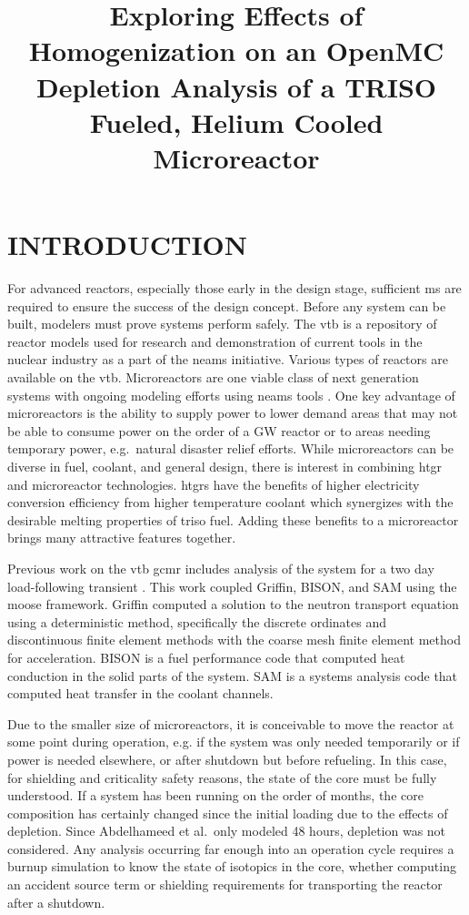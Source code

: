 \documentclass[letterpaper]{physor2024}
\title{Exploring Effects of Homogenization on an OpenMC Depletion Analysis of a TRISO Fueled, Helium Cooled Microreactor}
\begin{document}
\section{INTRODUCTION}\label{sec:intro}
For advanced reactors, especially those early in the design stage, sufficient \gls{ms} are required to ensure the success of the design concept. Before any system can be built, modelers must prove systems perform safely. The \gls{vtb} \cite{vtb2023} is a repository of reactor models used for research and demonstration of current tools in the nuclear industry as a part of the \gls{neams} initiative. Various types of reactors are available on the \gls{vtb}. Microreactors are one viable class of next generation systems with ongoing modeling efforts using \gls{neams} tools \cite{Stauff-preliminary-applications-2021, Stauff-applications-2022, Abdelhameed-ANS-2022}. One key advantage of microreactors is the ability to supply power to lower demand areas that may not be able to consume power on the order of a GW reactor or to areas needing temporary power, e.g.~natural disaster relief efforts. While microreactors can be diverse in fuel, coolant, and general design, there is interest in combining \gls{htgr} and microreactor technologies. \glspl{htgr} have the benefits of higher electricity conversion efficiency from higher temperature coolant which synergizes with the desirable melting properties of \gls{triso} fuel. Adding these benefits to a microreactor brings many attractive features together.

Previous work on the \gls{vtb} \gls{gcmr} includes analysis of the system for a two day load-following transient \cite{Abdelhameed-ANS-2022}. This work coupled Griffin, BISON, and SAM using the \gls{moose} framework. Griffin computed a solution to the neutron transport equation using a deterministic method, specifically the discrete ordinates and discontinuous finite element methods with the coarse mesh finite element method for acceleration. BISON is a fuel performance code that computed heat conduction in the solid parts of the system. SAM is a systems analysis code that computed heat transfer in the coolant channels.

Due to the smaller size of microreactors, it is conceivable to move the reactor at some point during operation, e.g. if the system was only needed temporarily or if power is needed elsewhere, or after shutdown but before refueling. In this case, for shielding and criticality safety reasons, the state of the core must be fully understood. If a system has been running on the order of months, the core composition has certainly changed since the initial loading due to the effects of depletion. Since Abdelhameed et al.~only modeled 48 hours, depletion was not considered. Any analysis occurring far enough into an operation cycle requires a burnup simulation to know the state of isotopics in the core, whether computing an accident source term or shielding requirements for transporting the reactor after a shutdown.
\end{document}
